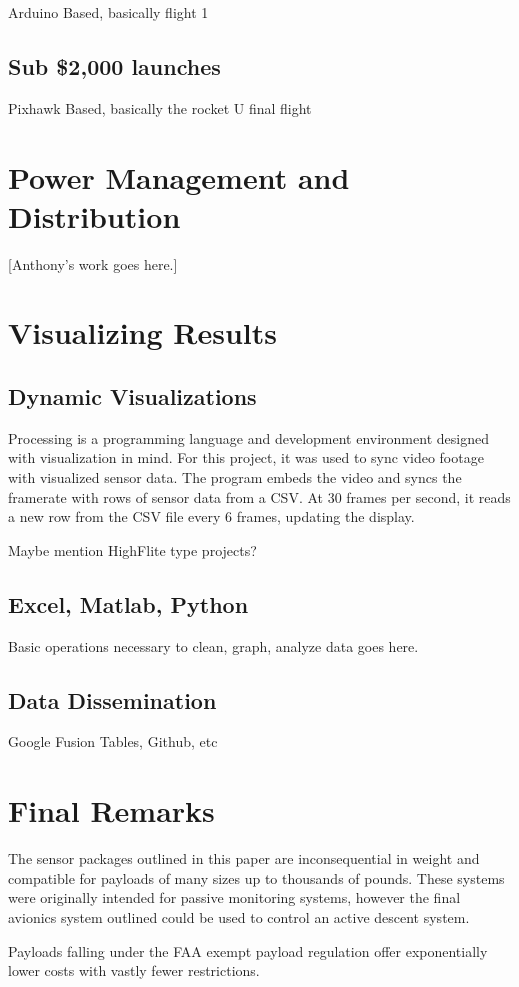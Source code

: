 \documentclass[heading.tex]{subfiles}
\begin{document}
Arduino Based, basically flight 1

\subsection{Sub \$2,000 launches}

Pixhawk Based, basically the rocket U final flight

\section{Power Management and Distribution}

[Anthony's work goes here.]

\section{Visualizing Results}


\subsection{Dynamic Visualizations}

Processing is a programming language and development environment designed
with visualization in mind. For this project, it was used to sync video
footage with visualized sensor data. The program embeds the video and syncs
the framerate with rows of sensor data from a CSV. At 30 frames per second,
it reads a new row from the CSV file every 6 frames, updating the display.

Maybe mention HighFlite type projects?

\subsection{Excel, Matlab, Python}

Basic operations necessary to clean, graph, analyze data goes here.

\subsection{Data Dissemination}

Google Fusion Tables, Github, etc

\section{Final Remarks}
The sensor packages outlined in this paper are inconsequential in weight and
compatible for payloads of many sizes up to thousands of pounds.
These systems were originally intended for passive monitoring systems, however the final avionics system outlined could be used to control an active descent system.

Payloads falling under the FAA exempt payload regulation offer exponentially
lower costs with vastly fewer restrictions. 
\end{document}
